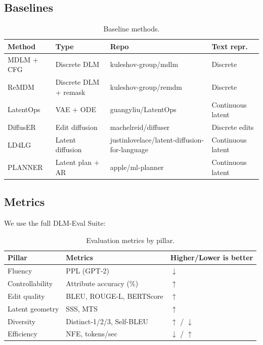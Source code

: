 \documentclass{article}
\begin{document}
\subsection{Baselines}

\begin{table}[h]
\centering
\caption{Baseline methods.}
\begin{tabular}{llll}
\toprule
\textbf{Method} & \textbf{Type} & \textbf{Repo} & \textbf{Text repr.} \\
\midrule
MDLM + CFG & Discrete DLM & kuleshov-group/mdlm & Discrete \\
ReMDM & Discrete DLM + remask & kuleshov-group/remdm & Discrete \\
LatentOps & VAE + ODE & guangyliu/LatentOps & Continuous latent \\
DiffusER & Edit diffusion & machelreid/diffuser & Discrete edits \\
LD4LG & Latent diffusion & justinlovelace/latent-diffusion-for-language & Continuous latent \\
PLANNER & Latent plan + AR & apple/ml-planner & Continuous latent \\
\bottomrule
\end{tabular}
\end{table}

\subsection{Metrics}

We use the full DLM-Eval Suite:

\begin{table}[h]
\centering
\caption{Evaluation metrics by pillar.}
\begin{tabular}{lll}
\toprule
\textbf{Pillar} & \textbf{Metrics} & \textbf{Higher/Lower is better} \\
\midrule
Fluency & PPL (GPT-2) & $\downarrow$ \\
Controllability & Attribute accuracy (\%) & $\uparrow$ \\
Edit quality & BLEU, ROUGE-L, BERTScore & $\uparrow$ \\
Latent geometry & SSS, MTS & $\uparrow$ \\
Diversity & Distinct-1/2/3, Self-BLEU & $\uparrow$ / $\downarrow$ \\
Efficiency & NFE, tokens/sec & $\downarrow$ / $\uparrow$ \\
\bottomrule
\end{tabular}
\end{table}
\end{document}
